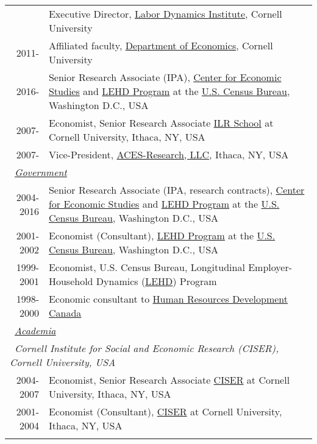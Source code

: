 \documentclass[10pt,letterpaper]{report}
\begin{document}
\begin{longtable}{rp{5in}}
\begin{tabular}{p{0.75in}p{4in}}
2011-    &Executive Director,  \href{http://www.ilr.cornell.edu/ldi}{Labor Dynamics Institute}, 
Cornell University\\ %
2011-    &Affiliated faculty, \href{http://economics.cornell.edu}{Department of Economics}, 
Cornell University\\ %
2016-    &Senior Research Associate (IPA),
\href{https://www.ces.census.gov}{Center for Economic Studies} and \href{https://lehd.ces.census.gov}{LEHD Program} at the
\href{https://www.census.gov}{U.S. Census Bureau}, Washington D.C., USA 
\\ %
2007-    & Economist, Senior Research Associate 
\href{http://www.ilr.cornell.edu}{ILR School} at Cornell University, Ithaca,
NY, USA 
\\%
2007-    & Vice-President,
\href{https://www.aces-research.com}{ACES-Research, LLC}, Ithaca,
NY, USA\\[.3cm]
\multicolumn{2}{l}{\ \it \underline{Government}}\\
2004-2016  &Senior Research Associate (IPA, research contracts),
\href{https://www.ces.census.gov}{Center for Economic Studies} and 
\href{https://lehd.ces.census.gov}{LEHD Program} at the
\href{https://www.census.gov}{U.S. Census Bureau}, Washington D.C., USA 
\\ %
2001-2002    &Economist (Consultant), \href{https://lehd.ces.census.gov}{LEHD Program} at the
\href{https://www.census.gov}{U.S. Census Bureau}, Washington D.C., USA 
\\%
1999-2001    &Economist, U.S. Census Bureau, Longitudinal
Employer-Household Dynamics (\href{https://lehd.ces.census.gov}{LEHD}) Program 
\\%
1998-2000    &Economic consultant to
\href{http://www.hrdc-drhc.gc.ca/}{Human Resources Development Canada}
\\[.3cm]

\multicolumn{2}{l}{\ \it \underline{Academia}}\\
%
%
\multicolumn{2}{l}{\ \it Cornell Institute for Social and Economic
  Research (CISER), Cornell University, USA}\\
2004-2007    & Economist, Senior Research Associate 
\href{http://www.ciser.cornell.edu}{CISER} at Cornell University, Ithaca,
NY, USA 
\\%
2001-2004    & Economist (Consultant), 
\href{http://www.ciser.cornell.edu}{CISER} at Cornell University, Ithaca,
NY, USA 
\\[.3cm]



\end{tabular}
\end{longtable}
\end{document}
